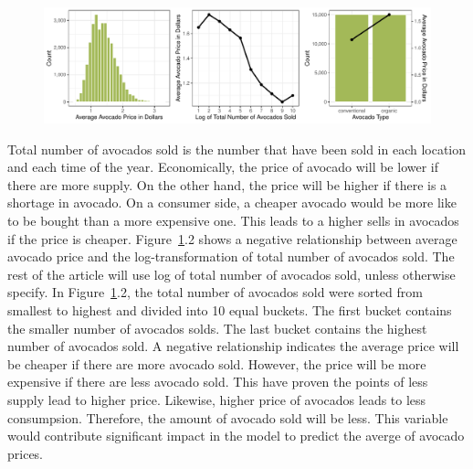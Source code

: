 \documentclass[11pt]{article}\usepackage[]{graphicx}\usepackage[]{color}
\makeatletter
\def\maxwidth{ %
  \ifdim\Gin@nat@width>\linewidth
    \linewidth
  \else
    \Gin@nat@width
  \fi
}
\makeatother
\begin{document}
\begin{figure}[h!] 
\begin{center}

\includegraphics[width=\maxwidth]{figure/unnamed-chunk-1-1} 

\caption{}
\label{explore1}
\end{center} 
\end{figure}

\noindent Total number of avocados sold is the number that have been sold in each location and each time of the year. Economically, the price of avocado will be lower if there are more supply. On the other hand, the price will be higher if there is a shortage in avocado. On a consumer side, a cheaper avocado would be more like to be bought than a more expensive one. This leads to a higher sells in avocados if the price is cheaper. Figure~\ref{explore1}.2 shows a negative relationship between average avocado price and the log-transformation of total number of avocados sold. The rest of the article will use log of total number of avocados sold, unless otherwise specify. In Figure~\ref{explore1}.2, the total number of avocados sold were sorted from smallest to highest and divided into 10 equal buckets. The first bucket contains the smaller number of avocados solds. The last bucket contains the highest number of avocados sold. A negative relationship indicates the average price will be cheaper if there are more avocado sold. However, the price will be more expensive if there are less avocado sold. This have proven the points of less supply lead to higher price. Likewise, higher price of avocados leads to less consumpsion. Therefore, the amount of avocado sold will be less. This variable would contribute significant impact in the model to predict the averge of avocado prices.  
\hfill \break
\end{document}
